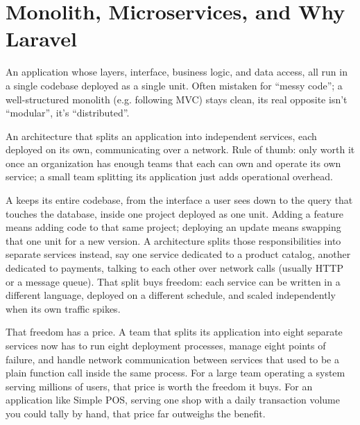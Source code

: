 \section{Monolith, Microservices, and Why Laravel}
\label{sec:arsitektur-web-modern-1}

\begin{istilahpenting}
\begin{description}[leftmargin=0pt,style=nextline]
  \item[Monolith] An application whose layers, interface, business logic, and data access, all run in a single codebase deployed as a single unit. Often mistaken for ``messy code''; a well-structured monolith (e.g. following MVC) stays clean, its real opposite isn't ``modular'', it's ``distributed''.
  \item[Microservices] An architecture that splits an application into independent services, each deployed on its own, communicating over a network. Rule of thumb: only worth it once an organization has enough teams that each can own and operate its own service; a small team splitting its application just adds operational overhead.
\end{description}
\end{istilahpenting}

A  keeps its entire codebase, from the interface a user sees
down to the query that touches the database, inside one project deployed as
one unit. Adding a feature means adding code to that same project;
deploying an update means swapping that one unit for a new version. A
 architecture splits those responsibilities into
separate services instead, say one service dedicated to a product catalog,
another dedicated to payments, talking to each other over network calls
(usually HTTP or a message queue). That split buys freedom: each service
can be written in a different language, deployed on a different schedule,
and scaled independently when its own traffic spikes.

That freedom has a price. A team that splits its application into eight
separate services now has to run eight deployment processes, manage eight
points of failure, and handle network communication between services that
used to be a plain function call inside the same process. For a large team
operating a system serving millions of users, that price is worth the
freedom it buys. For an application like Simple POS, serving one shop with
a daily transaction volume you could tally by hand, that price far
outweighs the benefit.


